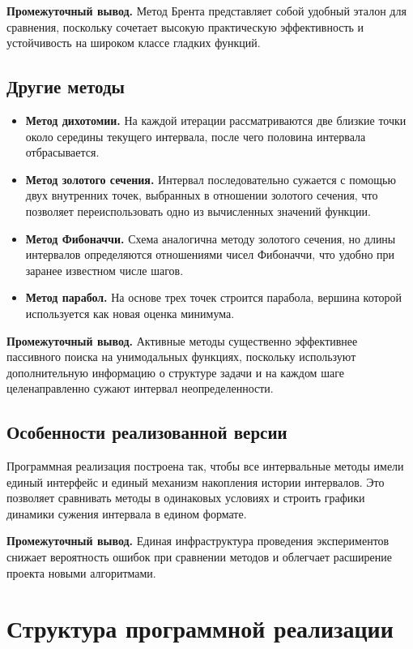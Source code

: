 \documentclass[14pt,a4paper]{extarticle}
\begin{document}
\textbf{Промежуточный вывод.} Метод Брента представляет собой удобный эталон для сравнения, поскольку сочетает высокую практическую эффективность и устойчивость на широком классе гладких функций.

\subsection{Другие методы}

\begin{itemize}
    \item \textbf{Метод дихотомии.} На каждой итерации рассматриваются две близкие точки около середины текущего интервала, после чего половина интервала отбрасывается.
    \item \textbf{Метод золотого сечения.} Интервал последовательно сужается с помощью двух внутренних точек, выбранных в отношении золотого сечения, что позволяет переиспользовать одно из вычисленных значений функции.
    \item \textbf{Метод Фибоначчи.} Схема аналогична методу золотого сечения, но длины интервалов определяются отношениями чисел Фибоначчи, что удобно при заранее известном числе шагов.
    \item \textbf{Метод парабол.} На основе трех точек строится парабола, вершина которой используется как новая оценка минимума.
\end{itemize}

\textbf{Промежуточный вывод.} Активные методы существенно эффективнее пассивного поиска на унимодальных функциях, поскольку используют дополнительную информацию о структуре задачи и на каждом шаге целенаправленно сужают интервал неопределенности.

\subsection{Особенности реализованной версии}

Программная реализация построена так, чтобы все интервальные методы имели единый интерфейс и единый механизм накопления истории интервалов. Это позволяет сравнивать методы в одинаковых условиях и строить графики динамики сужения интервала в едином формате.

\textbf{Промежуточный вывод.} Единая инфраструктура проведения экспериментов снижает вероятность ошибок при сравнении методов и облегчает расширение проекта новыми алгоритмами.

\section{Структура программной реализации}
\end{document}
